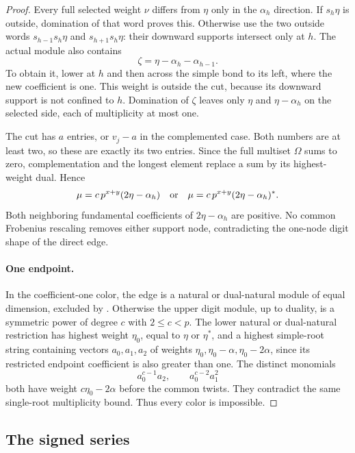 \begin{proof}
Every full selected weight $\nu$ differs from $\eta$ only in the
$\alpha_h$ direction. If $s_h\eta$ is outside, domination of that
word proves this. Otherwise use the two outside words
$s_{h-1}s_h\eta$ and $s_{h+1}s_h\eta$: their downward supports intersect
only at $h$. The actual module also contains
\[
 \zeta=\eta-\alpha_h-\alpha_{h-1}.
\]
To obtain it, lower at $h$ and then across the simple bond to its left,
where the new coefficient is one. This weight is outside the cut,
because its downward support is not confined to $h$. Domination of
$\zeta$ leaves only $\eta$ and $\eta-\alpha_h$ on the selected side,
each of multiplicity at most one.

The cut has $a$ entries, or $v_j-a$ in the complemented case. Both
numbers are at least two, so these are exactly its two entries.
Since the full multiset $\Omega$ sums to zero, complementation and
the longest element replace a sum by its highest-weight dual. Hence
\[
 \mu=c\,p^{x+y}(2\eta-\alpha_h)
 \quad\hbox{or}\quad
 \mu=c\,p^{x+y}(2\eta-\alpha_h)^*.
\]
Both neighboring fundamental coefficients of $2\eta-\alpha_h$ are
positive. No common Frobenius rescaling removes either support node,
contradicting the one-node digit shape of the direct edge.

\paragraph{One endpoint.}
In the coefficient-one color, the edge is a natural or dual-natural
module of equal dimension, excluded by .
Otherwise the upper digit module, up to duality, is a symmetric power
of degree $c$ with $2\le c<p$. The lower natural or dual-natural
restriction has highest weight $\eta_0$, equal to $\eta$ or $\eta^*$,
and a highest simple-root string containing vectors $a_0,a_1,a_2$
of weights $\eta_0,\eta_0-\alpha,\eta_0-2\alpha$, since its restricted endpoint
coefficient is also greater than one. The distinct monomials
\[
 a_0^{c-1}a_2,\qquad a_0^{c-2}a_1^2
\]
both have weight $c\eta_0-2\alpha$ before the common twists. They
contradict the same single-root multiplicity bound. Thus every color
is impossible.
\end{proof}

\subsection{The signed series}

